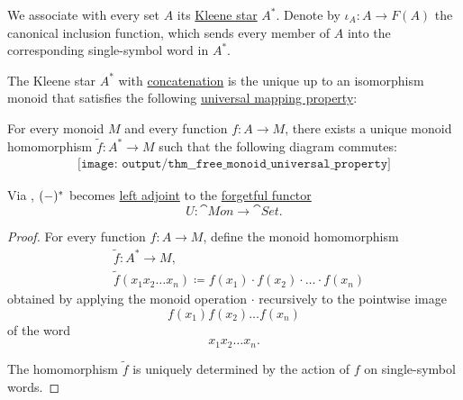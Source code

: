 \begin{theorem}\label{thm:free_monoid_universal_property}
  We associate with every set \( A \) its \hyperref[def:formal_language/kleene_star]{Kleene star} \( A^* \). Denote by \( \iota_A: A \to F(A) \) the canonical inclusion function, which sends every member of \( A \) into the corresponding single-symbol word in \( A^* \).

  The Kleene star \( A^* \) with \hyperref[def:formal_language/concatenation]{concatenation} is the unique up to an isomorphism monoid that satisfies the following \hyperref[rem:universal_mapping_property]{universal mapping property}:
  \begin{displayquote}
    For every monoid \( M \) and every function \( f: A \to M \), there exists a unique monoid homomorphism \( \widetilde{f}: A^* \to M \) such that the following diagram commutes:
    \begin{equation}\label{eq:thm:free_monoid_universal_property/diagram}
      \begin{aligned}
        \texttt{[image: output/thm\_\_free\_monoid\_universal\_property]}
      \end{aligned}
    \end{equation}
  \end{displayquote}

  Via , \( (\Anon*)^* \) becomes \hyperref[def:category_adjunction]{left adjoint} to the \hyperref[def:concrete_category]{forgetful functor}
  \begin{equation*}
    U: \cat{Mon} \to \cat{Set}.
  \end{equation*}
\end{theorem}
\begin{proof}
  For every function \( f: A \to M \), define the monoid homomorphism
  \begin{equation*}
    \begin{aligned}
      &\widetilde{f}: A^* \to M, \\
      &\widetilde{f}(x_1 x_2 \ldots x_n) \coloneqq f(x_1) \cdot f(x_2) \cdot \ldots \cdot f(x_n)
    \end{aligned}
  \end{equation*}
  obtained by applying the monoid operation \( \cdot \) recursively to the pointwise image
  \begin{equation*}
    f(x_1) f(x_2) \ldots f(x_n)
  \end{equation*}
  of the word
  \begin{equation*}
    x_1 x_2 \ldots x_n.
  \end{equation*}

  The homomorphism \( \widetilde{f} \) is uniquely determined by the action of \( f \) on single-symbol words.
\end{proof}

